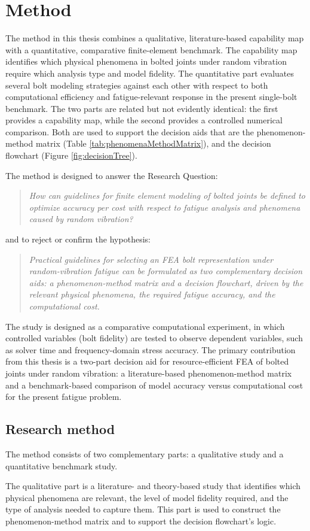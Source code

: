 \documentclass[a4paper,twoside]{bth}
\newcommand{\RQ}{How can guidelines for finite element modeling of bolted joints be defined to optimize accuracy per cost with respect to fatigue analysis and phenomena caused by random vibration?}
\newcommand{\HYP}{Practical guidelines for selecting an \ac{FEA} bolt representation under random-vibration fatigue can be formulated as two complementary decision aids: a phenomenon-method matrix and a decision flowchart, driven by the relevant physical phenomena, the required fatigue accuracy, and the computational cost.}
\begin{document}
\chapter{Method}
\label{chp:method}
The method in this thesis combines a qualitative, literature-based capability map with a quantitative, comparative finite-element benchmark. The capability map identifies which physical phenomena in bolted joints under random vibration require which analysis type and model fidelity. The quantitative part evaluates several bolt modeling strategies against each other with respect to both computational efficiency and fatigue-relevant response in the present single-bolt benchmark. The two parts are related but not evidently identical: the first provides a capability map, while the second provides a controlled numerical comparison. Both are used to support the decision aids that are the phenomenon-method matrix (Table \ref{tab:phenomenaMethodMatrix}), and the decision flowchart (Figure \ref{fig:decisionTree}).

The method is designed to answer the Research Question:

\begin{quote}
    \textit{\RQ}
\end{quote}

and to reject or confirm the hypothesis:

\begin{quote}
    \textit{\HYP}
\end{quote}

The study is designed as a comparative computational experiment, in which controlled variables (bolt fidelity) are tested to observe dependent variables, such as solver time and frequency-domain stress accuracy. The primary contribution from this thesis is a two-part decision aid for resource-efficient \ac{FEA} of bolted joints under random vibration: a literature-based phenomenon-method matrix and a benchmark-based comparison of model accuracy versus computational cost for the present fatigue problem.

\newpage
\section{Research method}

The method consists of two complementary parts: a qualitative study and a quantitative benchmark study.

The qualitative part is a literature- and theory-based study that identifies which physical phenomena are relevant, the level of model fidelity required, and the type of analysis needed to capture them. This part is used to construct the phenomenon-method matrix and to support the decision flowchart's logic.
\end{document}

